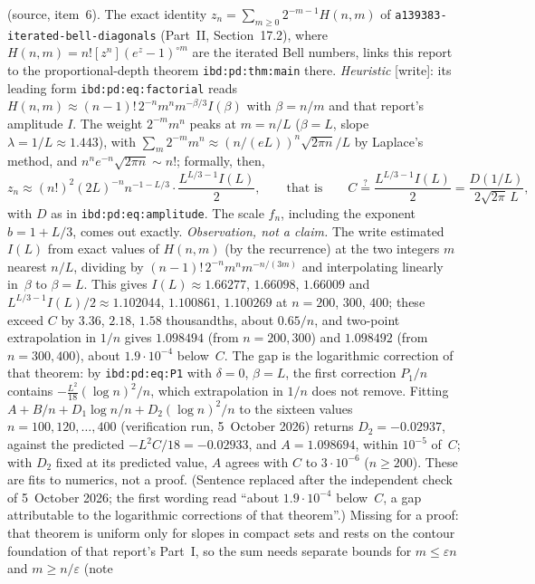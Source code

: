 \documentclass[11pt,letterpaper]{article}
\theoremstyle{definition}\newtheorem{definition}[theorem]{Definition}
\theoremstyle{remark}\newtheorem{remark}[theorem]{Remark}
\newcommand{\file}[1]{\nolinkurl{#1}}
\begin{document}
\begin{enumerate}
 (source, item~6). The exact identity
 $z_n=\sum_{m\ge0}2^{-m-1}H(n,m)$ of
 \file{a139383-iterated-bell-diagonals} (Part~II, Section~17.2), where
 $H(n,m)=n![z^n](e^z-1)^{\circ m}$ are the iterated Bell numbers, links this
 report to the proportional-depth theorem \file{ibd:pd:thm:main} there. \emph{Heuristic} [write]: its leading form
 \file{ibd:pd:eq:factorial} reads
 $H(n,m)\approx(n-1)!\,2^{-n}m^n m^{-\beta/3}I(\beta)$ with $\beta=n/m$ and
 that report's amplitude $I$. The weight $2^{-m}m^n$ peaks at $m=n/L$
 ($\beta=L$, slope $\lambda=1/L\approx1.443$), with
 $\sum_m2^{-m}m^n\approx(n/(eL))^n\sqrt{2\pi n}/L$ by Laplace's method, and
 $n^ne^{-n}\sqrt{2\pi n}\sim n!$; formally, then,
 \[
  z_n\approx(n!)^2(2L)^{-n}n^{-1-L/3}\cdot\frac{L^{L/3-1}I(L)}2,
  \qquad\text{that is}\qquad
  C\overset{?}{=}\frac{L^{L/3-1}I(L)}2=\frac{D(1/L)}{2\sqrt{2\pi}\,L},
 \]
 with $D$ as in \file{ibd:pd:eq:amplitude}. The scale $f_n$, including the
 exponent $b=1+L/3$, comes out exactly. \emph{Observation, not a claim.} The
 write estimated $I(L)$ from exact values of $H(n,m)$ (by the recurrence)
 at the two integers $m$ nearest $n/L$, dividing by
 $(n-1)!\,2^{-n}m^nm^{-n/(3m)}$ and interpolating linearly in~$\beta$ to
 $\beta=L$. This gives $I(L)\approx1.66277$, $1.66098$, $1.66009$ and
 $L^{L/3-1}I(L)/2\approx1.102044$, $1.100861$, $1.100269$ at $n=200$, $300$,
 $400$; these exceed $C$ by $3.36$, $2.18$, $1.58$ thousandths, about
 $0.65/n$, and two-point extrapolation in $1/n$ gives $1.098494$ (from
 $n=200,300$) and $1.098492$ (from $n=300,400$), about $1.9\cdot10^{-4}$ below~$C$.
 The gap is the logarithmic correction of that theorem: by
 \file{ibd:pd:eq:P1} with $\delta=0$, $\beta=L$, the first correction
 $P_1/n$ contains $-\tfrac{L^2}{18}(\log n)^2/n$, which extrapolation in
 $1/n$ does not remove. Fitting $A+B/n+D_1\log n/n+D_2(\log n)^2/n$ to the
 sixteen values $n=100,120,\ldots,400$ (verification run, 5~October 2026)
 returns $D_2=-0.02937$, against the predicted $-L^2C/18=-0.02933$, and
 $A=1.098694$, within $10^{-5}$ of~$C$; with $D_2$ fixed at its predicted
 value, $A$ agrees with $C$ to $3\cdot10^{-6}$ ($n\ge200$). These are fits
 to numerics, not a proof. \textup{(Sentence replaced after the independent
 check of 5~October 2026; the first wording read ``about
 $1.9\cdot10^{-4}$ below~$C$, a gap attributable to the logarithmic
 corrections of that theorem''.)} Missing for a
 proof: that theorem is uniform only for slopes in compact sets and rests on
 the contour foundation of that report's Part~I, so the sum needs separate
 bounds for $m\le\varepsilon n$ and $m\ge n/\varepsilon$ (note

\end{enumerate}
\end{document}
